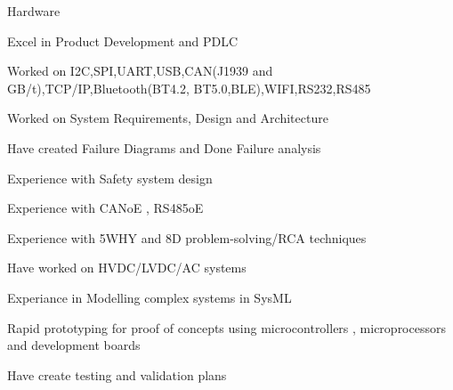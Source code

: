 

\begin{cventries}

  \cventry
    {} %
    {Hardware} %
    {} %
    {} %
    {
      \begin{cvitems} %
        \item {Excel in Product Development and PDLC}
        \item {Worked on I2C,SPI,UART,USB,CAN(J1939 and GB/t),TCP/IP,Bluetooth(BT4.2, BT5.0,BLE),WIFI,RS232,RS485}
        \item {Worked on System Requirements, Design and Architecture }
        \item {Have created Failure Diagrams and Done Failure analysis}
        \item {Experience with Safety system design }
        \item {Experience with CANoE , RS485oE }
        \item {Experience with 5WHY and 8D problem-solving/RCA techniques}
        \item {Have worked on HVDC/LVDC/AC systems}
        \item {Experiance in Modelling complex systems in SysML}
        \item {Rapid prototyping for proof of concepts using microcontrollers , microprocessors and development boards}
        \item {Have create testing and validation plans}
      \end{cvitems}
    }


\end{cventries}

